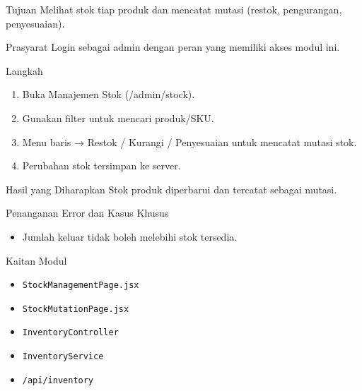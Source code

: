 
\begin{flowsection}{Tujuan}
Melihat stok tiap produk dan mencatat mutasi (restok, pengurangan, penyesuaian).
\end{flowsection}

\begin{flowsection}{Prasyarat}
Login sebagai admin dengan peran yang memiliki akses modul ini.
\end{flowsection}

\begin{flowsection}{Langkah}
\begin{enumerate}
  \item Buka Manajemen Stok (/admin/stock).
  \item Gunakan filter untuk mencari produk/SKU.
  \item Menu baris → Restok / Kurangi / Penyesuaian untuk mencatat mutasi stok.
  \item Perubahan stok tersimpan ke server.
\end{enumerate}
\end{flowsection}


\begin{flowsection}{Hasil yang Diharapkan}
Stok produk diperbarui dan tercatat sebagai mutasi.
\end{flowsection}

\begin{flowsection}{Penanganan Error dan Kasus Khusus}
\begin{itemize}
  \item Jumlah keluar tidak boleh melebihi stok tersedia.
\end{itemize}
\end{flowsection}

\begin{flowsection}{Kaitan Modul}
\begin{itemize}
  \item \texttt{StockManagementPage.jsx}
  \item \texttt{StockMutationPage.jsx}
  \item \texttt{InventoryController}
  \item \texttt{InventoryService}
  \item \texttt{/api/inventory}
\end{itemize}
\end{flowsection}

